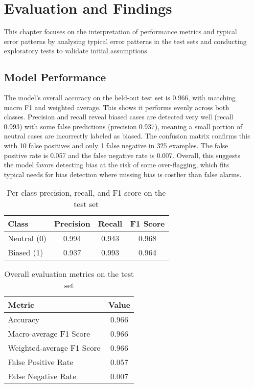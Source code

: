 \chapter{Evaluation and Findings}
    This chapter focuses on the interpretation of performance metrics and typical error patterns by analysing typical error patterns in the test sets and conducting exploratory tests to validate initial assumptions.

\section{Model Performance}
    The model’s overall accuracy on the held-out test set is 0.966, with matching macro F1 and weighted average. This shows it performs evenly across both classes. Precision and recall reveal biased cases are detected very well (recall 0.993) with some false predictions (precision 0.937), meaning a small portion of neutral cases are incorrectly labeled as biased. The confusion matrix confirms this with 10 false positives and only 1 false negative in 325 examples. The false positive rate is 0.057 and the false negative rate is 0.007. Overall, this suggests the model favors detecting bias at the risk of some over-flagging, which fits typical needs for bias detection where missing bias is costlier than false alarms.

        \vspace{0.8em}
        \begin{table}[H]
            \centering
            \begin{tabular}{lccc}
            \toprule
            \textbf{Class} & \textbf{Precision} & \textbf{Recall} & \textbf{F1 Score} \\
            \midrule
            Neutral (0) & 0.994 & 0.943 & 0.968 \\
            Biased (1)  & 0.937 & 0.993 & 0.964 \\
            \bottomrule
            \end{tabular}
            \caption{Per-class precision, recall, and F1 score on the test set}
        \end{table}

        \vspace{0.8em}
        \begin{table}[H]
            \centering
            \begin{tabular}{lc}
            \toprule
            \textbf{Metric} & \textbf{Value} \\
            \midrule
            Accuracy & 0.966 \\
            Macro-average F1 Score & 0.966 \\
            Weighted-average F1 Score & 0.966 \\
            False Positive Rate & 0.057 \\
            False Negative Rate & 0.007 \\
            \bottomrule
            \end{tabular}
            \caption{Overall evaluation metrics on the test set}
        \end{table}

